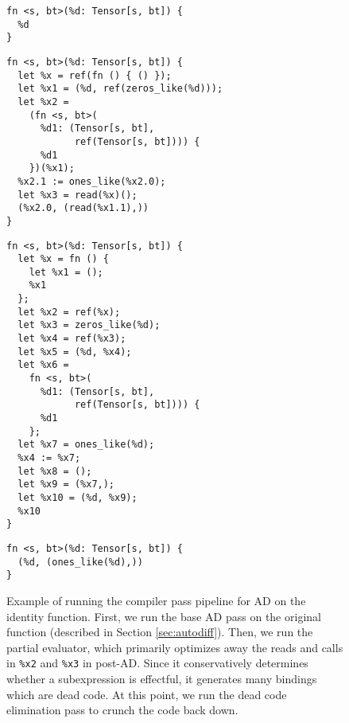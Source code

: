\begin{figure}
  \centering
    \begin{verbatim}
fn <s, bt>(%d: Tensor[s, bt]) {
  %d
}
    \end{verbatim}


    \begin{verbatim}
fn <s, bt>(%d: Tensor[s, bt]) {
  let %x = ref(fn () { () });
  let %x1 = (%d, ref(zeros_like(%d)));
  let %x2 =
    (fn <s, bt>(
      %d1: (Tensor[s, bt],
            ref(Tensor[s, bt]))) {
      %d1
    })(%x1);
  %x2.1 := ones_like(%x2.0);
  let %x3 = read(%x)();
  (%x2.0, (read(%x1.1),))
}
    \end{verbatim}

    \begin{verbatim}
fn <s, bt>(%d: Tensor[s, bt]) {
  let %x = fn () {
    let %x1 = ();
    %x1
  };
  let %x2 = ref(%x);
  let %x3 = zeros_like(%d);
  let %x4 = ref(%x3);
  let %x5 = (%d, %x4);
  let %x6 =
    fn <s, bt>(
      %d1: (Tensor[s, bt],
            ref(Tensor[s, bt]))) {
      %d1
    };
  let %x7 = ones_like(%d);
  %x4 := %x7;
  let %x8 = ();
  let %x9 = (%x7,);
  let %x10 = (%d, %x9);
  %x10
}
    \end{verbatim}


    \begin{verbatim}
fn <s, bt>(%d: Tensor[s, bt]) {
  (%d, (ones_like(%d),))
}
  \end{verbatim}
  \caption{
    Example of running the compiler pass pipeline for AD on the identity
    function.
    First, we run the base AD pass on the original function (described in Section \ref{sec:autodiff}).
    Then, we run the partial evaluator,
      which primarily optimizes away the reads and calls in \texttt{\%x2} and
      \texttt{\%x3} in post-AD.
    Since it conservatively determines whether a subexpression is effectful,
      it generates many bindings which are dead code.
    At this point, we run the dead code elimination pass to crunch the code back down.
  }
  \label{fig:pe-example}
\end{figure}

